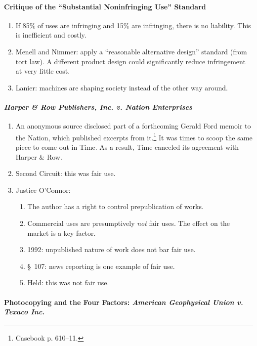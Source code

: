 \paragraph{Critique of the ``Substantial Noninfringing Use'' Standard}

\begin{enumerate}
    \item If 85\% of uses are infringing and 15\% are infringing, there is no 
    liability. This is inefficient and costly.
    \item Menell and Nimmer: apply a ``reasonable alternative design'' 
    standard (from tort law). A different product design could significantly 
    reduce infringement at very little cost.
    \item Lanier: machines are shaping society instead of the other way 
    around.
\end{enumerate}

\paragraph{\emph{Harper \& Row Publishers, Inc. v. Nation Enterprises}}

\begin{enumerate}
    \item An anonymous source disclosed part of a forthcoming Gerald Ford 
    memoir to the Nation, which published excerpts from it.\footnote{Casebook 
    p. 610--11.} It was times to scoop the same piece to come out in Time. As 
    a result, Time canceled its agreement with Harper \& Row.
    \item Second Circuit: this was fair use.
    \item Justice O'Connor:
    \begin{enumerate}
        \item The author has a right to control prepublication of works.
        \item Commercial uses are presumptively \emph{not} fair uses. The 
        effect on the market is a key factor.
        \item 1992: unpublished nature of work does not bar fair use.
        \item \S\ 107: news reporting is one example of fair use.
        \item Held: this was not fair use.
    \end{enumerate}
\end{enumerate}

\paragraph{Photocopying and the Four Factors: \emph{American Geophysical Union 
v. Texaco Inc.}}

